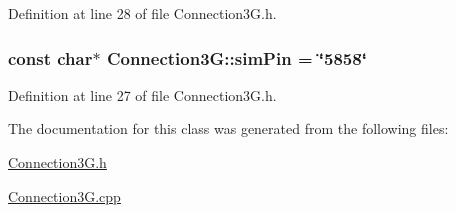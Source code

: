 Definition at line 28 of file Connection3\+G.\+h.

\subsubsection[{\texorpdfstring{sim\+Pin}{simPin}}]{\setlength{\rightskip}{0pt plus 5cm}const char$\ast$ Connection3\+G\+::sim\+Pin = \char`\"{}5858\char`\"{}\hspace{0.3cm}{\ttfamily [private]}}\hypertarget{class_connection3_g_a61fdd6b524f3602a33cfb0fdb00416ac}{}\label{class_connection3_g_a61fdd6b524f3602a33cfb0fdb00416ac}


Definition at line 27 of file Connection3\+G.\+h.



The documentation for this class was generated from the following files\+:\begin{DoxyCompactItemize}
\item 
\hyperlink{_connection3_g_8h}{Connection3\+G.\+h}\item 
\hyperlink{_connection3_g_8cpp}{Connection3\+G.\+cpp}\end{DoxyCompactItemize}
